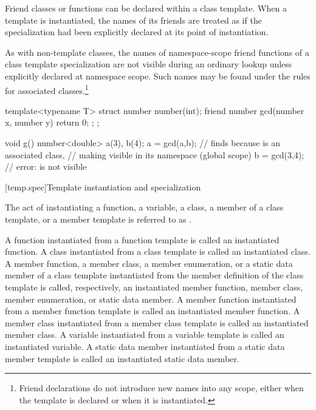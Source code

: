 \pnum
Friend classes or functions can be declared within a class template.
When a template is instantiated, the names of its friends are treated
as if the specialization had been explicitly declared at its point of
instantiation.

\pnum
As with non-template classes, the names of namespace-scope friend
functions of a class template specialization are not visible during
an ordinary lookup unless explicitly declared at namespace scope.
Such names may be found under the rules for associated
classes.\footnote{Friend declarations do not
introduce new names into any scope, either
when the template is declared or when it is instantiated.}
\begin{example}
\begin{codeblock}
template<typename T> struct number {
  number(int);
  friend number gcd(number x, number y) { return 0; };
};

void g() {
  number<double> a(3), b(4);
  a = gcd(a,b);     // finds  because  is an associated class,
                    // making  visible in its namespace (global scope)
  b = gcd(3,4);     // error:  is not visible
}
\end{codeblock}
\end{example}

[temp.spec]{Template instantiation and specialization}

\pnum
{}%
The act of instantiating a function, a variable,
a class, a member of a class template, or
a member template is referred to as
.

\pnum
A function instantiated from a function template is called an instantiated
function.
A class instantiated from a class template is called an instantiated class.
A member function, a member class, a member enumeration, or a static data member of a class template
instantiated from the member definition of the class template is called,
respectively, an instantiated member function, member class, member enumeration, or static data
member.
A member function instantiated from a member function template is called an
instantiated member function.
A member class instantiated from a member class template is called an
instantiated member class.
A variable instantiated from a variable template is called an
instantiated variable.
A static data member instantiated from a static data member template
is called an instantiated static data member.

